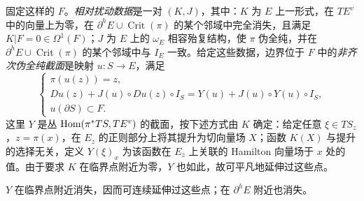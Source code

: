 固定这样的 $F$。\emph{相对扰动数据}是一对 $(K,J)$，其中：$K$ 为 $E$ 上一形式，在 $TE^v$ 中的向量上为零，在 $\partial^hE\cup\operatorname{Crit}(\pi)$ 的某个邻域中完全消失，且满足 $K|F=0\in\Omega^1(F)$；$J$ 为 $E$ 上的 $\omega_E$ 相容殆复结构，使 $\pi$ 伪全纯，并在 $\partial^hE\cup\operatorname{Crit}(\pi)$ 的某个邻域中与 $I_E$ 一致。给定这些数据，边界位于 $F$ 中的\emph{非齐次伪全纯截面}是映射 $u:S\to E$，满足
\begin{equation}\label{eq:17.2}
\begin{cases}
\pi(u(z))=z,\\
Du(z)+J(u)\circ Du(z)\circ I_S=Y(u)+J(u)\circ Y(u)\circ I_S,\\
u(\partial S)\subset F.
\end{cases}
\end{equation}
这里 $Y$ 是丛 $\operatorname{Hom}(\pi^*TS,TE^v)$ 的截面，按下述方式由 $K$ 确定：给定任意 $\xi\in TS_z$，$z=\pi(x)$，在 $E_z$ 的正则部分上将其提升为切向量场 $X$；函数 $K(X)$ 与提升的选择无关，定义 $Y(\xi)_x$ 为该函数在 $E_z$ 上关联的 Hamilton 向量场于 $x$ 处的值。由于要求 $K$ 在临界点附近为零，$Y$ 也如此，故可平凡地延伸过这些点。

$Y$ 在临界点附近消失，因而可连续延伸过这些点；在 $\partial^hE$ 附近也消失。

